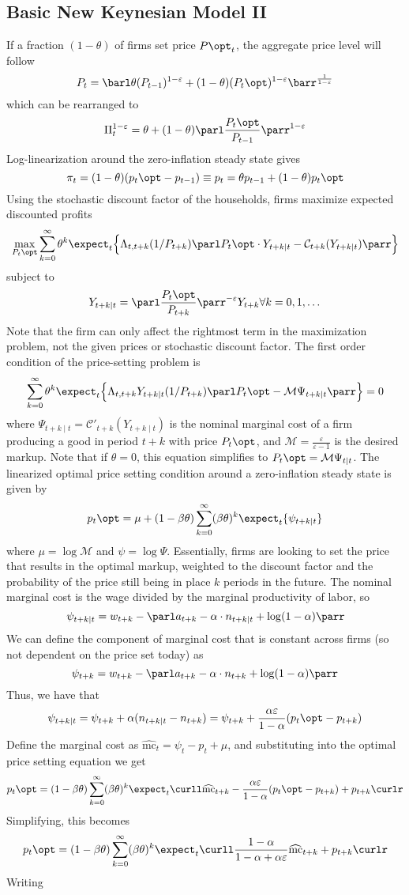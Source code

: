 \documentclass[10pt]{article}
\begin{document}
\subsection{Basic New Keynesian Model II}\label{subsec:4}


If a fraction $(1-\theta)$ of firms set price $P\opt_t$, the aggregate price level will follow \[P_t = \barl \theta (P_{t-1})^{1-\varepsilon} + (1-\theta) (P_t\opt)^{1-\varepsilon}\barr^{\frac{1}{1-\varepsilon}}\]which can be rearranged to \[\Pi_t^{1-\varepsilon} = \theta + (1-\theta) \parl \frac{P_t\opt}{P_{t-1}}\parr^{1-\varepsilon}\]Log-linearization around the zero-inflation steady state gives\[\pi_t = (1-\theta) (p_t\opt - p_{t-1}) \equiv p_t = \theta p_{t-1}+(1-\theta)p_t\opt\]Using the stochastic discount factor of the households, firms maximize expected discounted profits\[\max_{P_t\opt}\sum_{k=0}^\infty \theta^k \expect_t \Big\{ \Lambda_{t,t+k}(1/P_{t+k})\parl P_t\opt \cdot Y_{t+k\mid t}-\mathcal{C}_{t+k} (Y_{t+k\mid t})\parr \Big\}\]subject to \[Y_{t+k\mid t} = \parl \frac{P_t\opt}{P_{t+k}}\parr^{-\varepsilon} Y_{t+k} \forall k = 0,1,\dots\]Note that the firm can only affect the rightmost term in the maximization problem, not the given prices or stochastic discount factor. The first order condition of the price-setting problem is \[\sum_{k=0}^\infty \theta^k \expect_t \Big\{ \Lambda_{t,t+k} Y_{t+k\mid t}(1/P_{t+k})\parl P_t\opt - \mathcal{M}\Psi_{t+k\mid t} \parr\Big\} = 0\]where $\Psi_{t+k\mid t} = \mathcal{C}'_{t+k}(Y_{t+k\mid t})$ is the nominal marginal cost of a firm producing a good in period $t+k$ with price $P_t\opt$, and $\mathcal{M} = \frac{\varepsilon}{\varepsilon -1}$ is the desired markup. Note that if $\theta=0$, this equation simplifies to $P_t\opt = \mathcal{M} \Psi_{t\mid t}$. The linearized optimal price setting condition around a zero-inflation steady state is given by \[p_t\opt = \mu + (1-\beta\theta)\sum_{k=0}^\infty (\beta\theta)^k \expect_t\{\psi_{t+k \mid t}\}\]where $\mu = \log \mathcal{M}$ and $\psi= \log\Psi$. Essentially, firms are looking to set the price that results in the optimal markup, weighted to the discount factor and the probability of the price still being in place $k$ periods in the future. The nominal marginal cost is the wage divided by the marginal productivity of labor, so \[\psi_{t+k \mid t} = w_{t+k} - \parl a_{t+k} - \alpha \cdot n_{t+k\mid t} + \log (1-\alpha)\parr\]We can define the component of marginal cost that is constant across firms (so not dependent on the price set today) as \[\psi_{t+k} =  w_{t+k} - \parl a_{t+k} - \alpha \cdot n_{t+k} + \log (1-\alpha)\parr\]Thus, we have that \[\psi_{t+k \mid t} = \psi_{t+k} + \alpha (n_{t+k\mid t} - n_{t+k}) = \psi_{t+k} + \frac{\alpha\varepsilon}{1-\alpha }(p_t\opt - p_{t+k})\]Define the marginal cost as $\widehat{\text{mc}}_t = \psi_t - p_t + \mu$, and substituting into the optimal price setting equation we get \[p_t\opt = (1-\beta\theta) \sum_{k=0}^\infty (\beta\theta)^k \expect_t \curll \widehat{\text{mc}}_{t+k} - \frac{\alpha\varepsilon}{1-\alpha} (p_t\opt - p_{t+k}) + p_{t+k}\curlr\]Simplifying, this becomes\[p_t\opt = (1-\beta\theta) \sum_{k=0}^\infty (\beta\theta)^k \expect_t \curll \frac{1-\alpha}{1-\alpha +\alpha\varepsilon}\widehat{\text{mc}}_{t+k} + p_{t+k}\curlr\]Writing 
\end{document}
